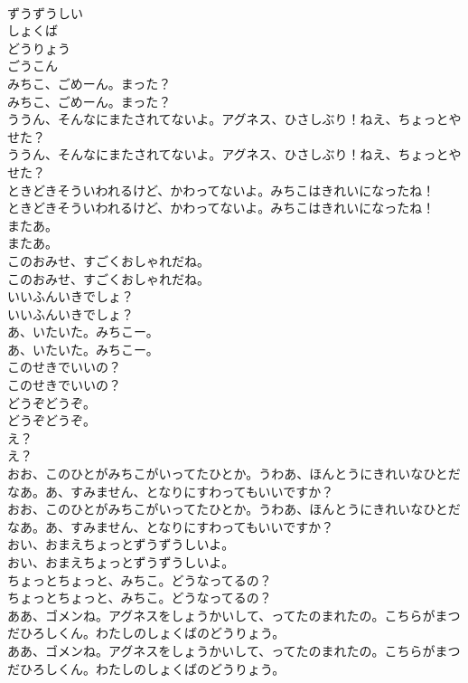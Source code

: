 \documentclass[8pt]{extreport}
\begin{document}
\begin{CJK}{UTF8}{min}
\\	ずうずうしい
\\	しょくば
\\	どうりょう
\\	ごうこん
\\	みちこ、ごめーん。まった？	
\\	みちこ、ごめーん。まった？ 
\\	ううん、そんなにまたされてないよ。アグネス、ひさしぶり！ねえ、ちょっとやせた？	
\\	ううん、そんなにまたされてないよ。アグネス、ひさしぶり！ねえ、ちょっとやせた？ 
\\	ときどきそういわれるけど、かわってないよ。みちこはきれいになったね！	
\\	ときどきそういわれるけど、かわってないよ。みちこはきれいになったね！ 
\\	またあ。	
\\	またあ。 
\\	このおみせ、すごくおしゃれだね。	
\\	このおみせ、すごくおしゃれだね。 
\\	いいふんいきでしょ？	
\\	いいふんいきでしょ？ 
\\	あ、いたいた。みちこー。	
\\	あ、いたいた。みちこー。 
\\	このせきでいいの？	
\\	このせきでいいの？ 
\\	どうぞどうぞ。	
\\	どうぞどうぞ。 
\\	え？	
\\	え？ 
\\	おお、このひとがみちこがいってたひとか。うわあ、ほんとうにきれいなひとだなあ。あ、すみません、となりにすわってもいいですか？	
\\	おお、このひとがみちこがいってたひとか。うわあ、ほんとうにきれいなひとだなあ。あ、すみません、となりにすわってもいいですか？ 
\\	おい、おまえちょっとずうずうしいよ。	
\\	おい、おまえちょっとずうずうしいよ。 
\\	ちょっとちょっと、みちこ。どうなってるの？	
\\	ちょっとちょっと、みちこ。どうなってるの？ 
\\	ああ、ゴメンね。アグネスをしょうかいして、ってたのまれたの。こちらがまつだひろしくん。わたしのしょくばのどうりょう。	
\\	ああ、ゴメンね。アグネスをしょうかいして、ってたのまれたの。こちらがまつだひろしくん。わたしのしょくばのどうりょう。 

\end{CJK}
\end{document}
